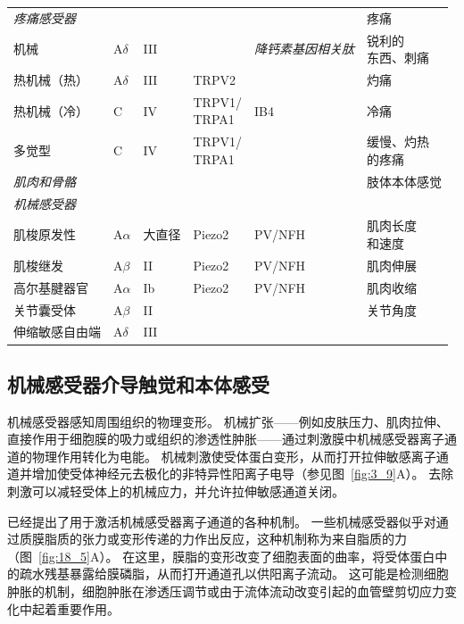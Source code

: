 \begin{table}[htbp]
\begin{tabular}{llllll}
		\textit{疼痛感受器} &  &  & &  & 疼痛 \\
		机械 & A$\delta$ & III & & \textit{降钙素基因相关肽} & \makecell[l]{锐利的\\东西、刺痛} \\
		热机械（热） & A$\delta$ & III & TRPV2 &  & 灼痛 \\
		热机械（冷） & C & IV & \makecell[l]{TRPV1/\\TRPA1} & IB4 & 冷痛 \\
		多觉型 & C & IV & \makecell[l]{TRPV1/\\TRPA1} &  & \makecell[l]{缓慢、灼热\\的疼痛} \\
		\textit{肌肉和骨骼} &  &  &  &  & 肢体本体感觉 \\
		\textit{机械感受器} &  &  &  &  &  \\
		肌梭原发性 & A$\alpha$ & 大直径 & Piezo2 & PV/NFH & \makecell[l]{肌肉长度\\和速度} \\
		肌梭继发 & A$\beta$ & II & Piezo2 & PV/NFH & 肌肉伸展 \\
		高尔基腱器官 & A$\alpha$ & Ib & Piezo2 & PV/NFH & 肌肉收缩 \\
		关节囊受体 & A$\beta$ & II &  &  & 关节角度 \\
		伸缩敏感自由端 & A$\delta$ & III &  &  & \makecell[l]{过度拉伸或用力} \\
		\bottomrule
	\end{tabular}
\end{table}


\subsection{机械感受器介导触觉和本体感受}

机械感受器感知周围组织的物理变形。
机械扩张——例如皮肤压力、肌肉拉伸、直接作用于细胞膜的吸力或组织的渗透性肿胀——通过刺激膜中机械感受器离子通道的物理作用转化为电能。
机械刺激使受体蛋白变形，从而打开拉伸敏感离子通道并增加使受体神经元去极化的非特异性阳离子电导（参见图~\ref{fig:3_9}A）。
去除刺激可以减轻受体上的机械应力，并允许拉伸敏感通道关闭。


已经提出了用于激活机械感受器离子通道的各种机制。
一些机械感受器似乎对通过质膜脂质的张力或变形传递的力作出反应，这种机制称为来自脂质的力（图~\ref{fig:18_5}A）。
在这里，膜脂的变形改变了细胞表面的曲率，将受体蛋白中的疏水残基暴露给膜磷脂，从而打开通道孔以供阳离子流动。
这可能是检测细胞肿胀的机制，细胞肿胀在渗透压调节或由于流体流动改变引起的血管壁剪切应力变化中起着重要作用。


